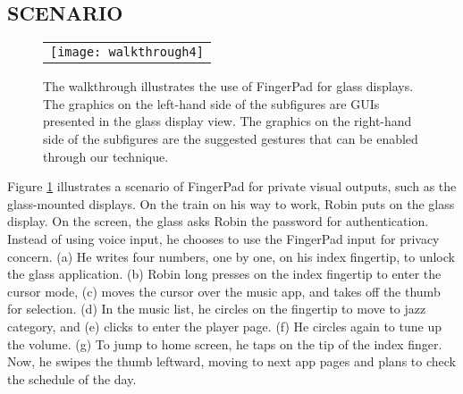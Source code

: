 \subsection{SCENARIO}
\begin{figure}
\begin{center}
  \begin{tabular}{@{\hspace{0.1cm}}c}
		\texttt{[image: walkthrough4]}\\
   \end{tabular}
\caption{The walkthrough illustrates the use of FingerPad for glass displays. The graphics on the left-hand side of the subfigures are GUIs presented in the glass display view. The graphics on the right-hand side of the subfigures are the suggested gestures that can be enabled through our technique. }
\label{fig:walkthrough}
\end{center}
\end{figure}

Figure \ref{fig:walkthrough} illustrates a scenario of FingerPad for private visual outputs, such as the glass-mounted displays.
On the train on his way to work, Robin puts on the glass display. 
On the screen, the glass asks Robin the password for authentication. Instead of using voice input, he chooses to use the FingerPad input for privacy concern. 
(a) He writes four numbers, one by one, on his index fingertip, to unlock the glass application. 
(b) Robin long presses on the index fingertip to enter the cursor mode, (c) moves the cursor over the music app, and takes off the thumb for selection.
(d) In the music list, he circles on the fingertip to move to jazz category, and (e) clicks to enter the player page. (f) He circles again to tune up the volume. (g) To jump to home screen, he taps on the tip of the index finger. Now, he swipes the thumb leftward, moving to next app pages and plans to check the schedule of the day.

